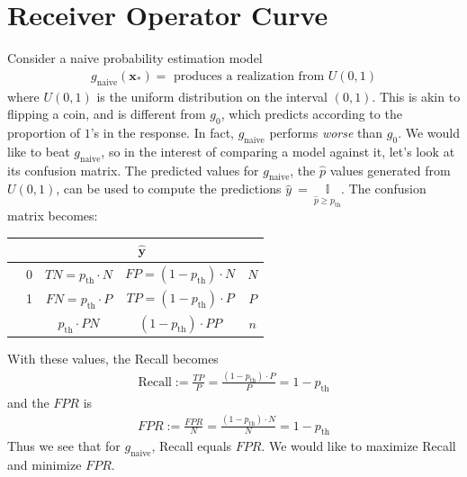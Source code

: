 \documentclass[12pt, a4paper]{article}
\theoremstyle{definition}
\begin{document}
	\section{Receiver Operator Curve}
	Consider a naive probability estimation model
	\begin{align*}
		g_{\text{naive}}(\bm{x}_*) = \text{ produces a realization from } U(0, 1)
	\end{align*}
	where $U(0, 1)$ is the uniform distribution on the interval $(0, 1)$.
	This is akin to flipping a coin, and is different from $g_0$, which predicts
	according to the proportion of $1$'s in the response. In fact, $g_{\text{naive}}$
	performs \textit{worse} than $g_0$. We would like to beat $g_{\text{naive}}$,
	so in the interest of comparing a model against it, let's look at its confusion
	matrix. The predicted values for $g_{\text{naive}}$, the $\hat{p}$ values
	generated from $U(0, 1)$, can be used to compute the predictions
	$\hat{y}~=~\underset{\hat{p} \geq p_{\text{th}}}{\mathbb{I}}$. The
	confusion matrix becomes:
	\begin{center}
		\begin{tabular}{c|c|c|c|c}
			{} & \multicolumn{4}{c}{$\hat{\bm{y}}$}\\
			\hline
			\multirow{3}{*}{\rotatebox[origin=c]{90}{$\bm{y}$}}
			{} & 0  & $TN = p_{\text{th}} \cdot N$ & $FP = (1 - p_{\text{th}})\cdot N$ & $N$\\
			\hline
			{} & 1  & $FN = p_{\text{th}} \cdot P$ & $TP = (1 - p_{\text{th}})\cdot P$ & $P$\\
			\hline
			{} & {} & $p_{\text{th}} \cdot PN$ & $(1 - p_{\text{th}}) \cdot PP$ & $n$
		\end{tabular}
	\end{center}
	With these values, the Recall becomes
	\begin{align*}
		\text{Recall} := \frac{TP}{P} = \frac{(1 - p_{\text{th}})\cdot P}{P} = 1 - p_{\text{th}}
	\end{align*}
	and the $FPR$ is
	\begin{align*}
		FPR := \frac{FPR}{N} = \frac{(1 - p_{\text{th}})\cdot N}{N} = 1 - p_{\text{th}}
	\end{align*}
	Thus we see that for $g_{\text{naive}}$, Recall equals $FPR$. We would like
	to maximize Recall and minimize $FPR$.
\end{document}
